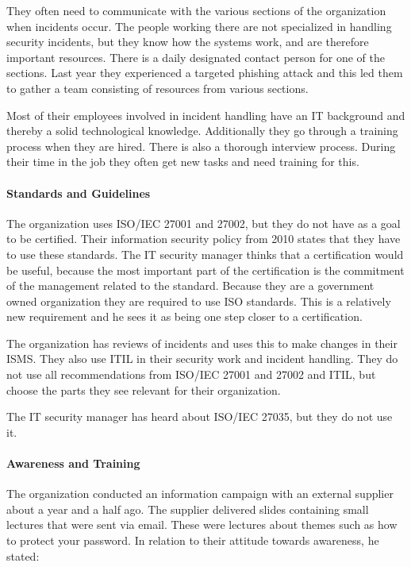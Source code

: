 They often need to communicate with the various sections of the organization when incidents occur. The people working there are not specialized in handling security incidents, but they know how the systems work, and are therefore important resources. There is a daily designated contact person for one of the sections. Last year they experienced a targeted phishing attack and this led them to gather a team consisting of resources from various sections.

Most of their employees involved in incident handling have an IT background and thereby a solid technological knowledge. Additionally they go through a training process when they are hired. There is also a thorough interview process. During their time in the job they often get new tasks and need training for this. 

\paragraph{Standards and Guidelines}
The organization uses \acs{ISO}/\acs{IEC} 27001 and 27002, but they do not have as a goal to be certified. Their information security policy from 2010 states that they have to use these standards. The IT security manager thinks that a certification would be useful, because the most important part of the certification is the commitment of the management related to the standard. Because they are a government owned organization they are required to use \acs{ISO} standards. This is a relatively new requirement and he sees it as being one step closer to a certification.

The organization has reviews of incidents and uses this to make changes in their \ac{ISMS}. They also use \ac{ITIL} in their security work and incident handling. They do not use all recommendations from \acs{ISO}/\acs{IEC} 27001 and 27002 and \ac{ITIL}, but choose the parts they see relevant for their organization.

The IT security manager has heard about \acs{ISO}/\acs{IEC} 27035, but they do not use it.

\paragraph{Awareness and Training}
The organization conducted an information campaign with an external supplier about a year and a half ago. The supplier delivered slides containing small lectures that were sent via email. These were lectures about themes such as how to protect your password. In relation to their attitude towards awareness, he stated: 

